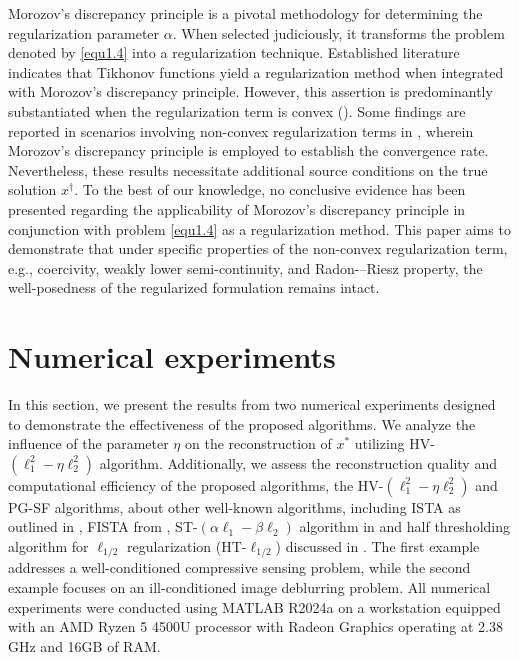 \documentclass[a4paper,12pt]{article}
\numberwithin{equation}{section}
\begin{document}
\par Morozov's discrepancy principle is a pivotal methodology for determining the regularization parameter $\alpha$. When selected judiciously, it transforms the problem denoted by \eqref{equ1.4} into a regularization technique. Established literature indicates that Tikhonov functions yield a regularization method when integrated with Morozov's discrepancy principle. However, this assertion is predominantly substantiated when the regularization term is convex (\cite{AR10,R01,TLY98}). Some findings are reported in scenarios involving non-convex regularization terms in \cite{DH19,WLMC13}, wherein Morozov's discrepancy principle is employed to establish the convergence rate. Nevertheless, these results necessitate additional source conditions on the true solution $x^{\dagger}$. To the best of our knowledge, no conclusive evidence has been presented regarding the applicability of Morozov's discrepancy principle in conjunction with problem \eqref{equ1.4} as a regularization method. This paper aims to demonstrate that under specific properties of the non-convex regularization term, e.g., coercivity, weakly lower semi-continuity, and Radon-–Riesz property, the well-posedness of the regularized formulation remains intact.

\section{Numerical experiments}\label{sec6}

\par In this section, we present the results from two numerical experiments designed to demonstrate the effectiveness of the proposed algorithms. We analyze the influence of the parameter $\eta$ on the reconstruction of $x^{*}$ utilizing HV-$\left(\ell_{1}^{2}-\eta\ell_{2}^{2}\right)$ algorithm. Additionally, we assess the reconstruction quality and computational efficiency of the proposed algorithms, the HV-$\left(\ell_{1}^{2}-\eta\ell_{2}^{2}\right)$ and PG-SF algorithms, about other well-known algorithms, including ISTA as outlined in \cite{DDD04}, FISTA from \cite{BT09}, ST-$\left(\alpha\ell_{1}-\beta\ell_{2}\right)$ algorithm in \cite{DH24} and half thresholding algorithm for $\ell_{1/2}$ regularization (HT-$\ell_{1/2}$) discussed in \cite{XCXZ12}. The first example addresses a well-conditioned compressive sensing problem, while the second example focuses on an ill-conditioned image deblurring problem. All numerical experiments were conducted using MATLAB R2024a on a workstation equipped with an AMD Ryzen 5 4500U processor with Radeon Graphics operating at 2.38 GHz and 16GB of RAM.
\end{document}
